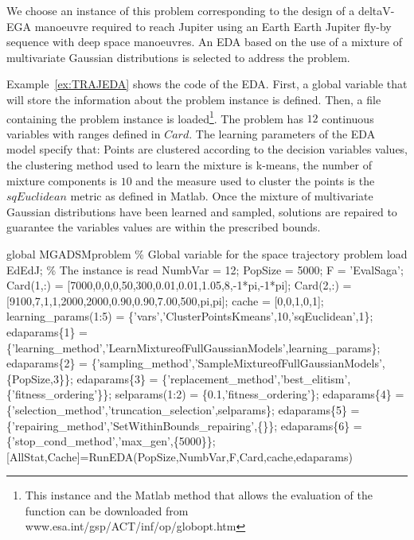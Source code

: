 \documentclass[a4paper]{article}
\begin{document}
We choose an instance of this problem corresponding to the design of a deltaV-EGA manoeuvre
required to reach Jupiter using an Earth Earth Jupiter fly-by sequence with deep space
manoeuvres. An EDA based on the use of a mixture of multivariate Gaussian distributions is selected
to address the problem.

Example~\ref{ex:TRAJEDA} shows the code of the EDA. First, a global variable that will store
the information about the problem instance is defined. Then, a file containing the problem
 instance is loaded\footnote{This instance and the  Matlab method that
 allows the evaluation of the function can be downloaded from
 www.esa.int/gsp/ACT/inf/op/globopt.htm}. The problem has $12$ continuous variables
 with ranges defined in $Card$. The learning parameters of the EDA model specify that:
 Points are clustered according to the decision variables values,
 the clustering method used to learn the mixture is
 k-means,  the number of mixture components is $10$ and the measure used to cluster the points
 is the $sqEuclidean$ metric as defined in Matlab.
 Once the mixture of multivariate Gaussian distributions have been learned and sampled, solutions
 are repaired to guarantee the variables values are within the prescribed bounds.



\begin{example}
\begin{programf}
 global MGADSMproblem \% Global variable for the space trajectory problem
 load EdEdJ;    \% The instance is read
 NumbVar = 12;
 PopSize = 5000;
 F = 'EvalSaga';
 Card(1,:) = [7000,0,0,0,50,300,0.01,0.01,1.05,8,-1*pi,-1*pi];
 Card(2,:) = [9100,7,1,1,2000,2000,0.90,0.90,7.00,500,pi,pi];
 cache  = [0,0,1,0,1];
 learning\_params(1:5) = \{'vars','ClusterPointsKmeans',10,'sqEuclidean',1\};
 edaparams\{1\} = \{'learning\_method','LearnMixtureofFullGaussianModels',learning\_params\};
 edaparams\{2\} = \{'sampling\_method','SampleMixtureofFullGaussianModels',\{PopSize,3\}\};
 edaparams\{3\} = \{'replacement\_method','best\_elitism',\{'fitness\_ordering'\}\};
 selparams(1:2) = \{0.1,'fitness\_ordering'\};
 edaparams\{4\} = \{'selection\_method','truncation\_selection',selparams\};
 edaparams\{5\} = \{'repairing\_method','SetWithinBounds\_repairing',\{\}\};
 edaparams\{6\} = \{'stop\_cond\_method','max\_gen',\{5000\}\};
 [AllStat,Cache]=RunEDA(PopSize,NumbVar,F,Card,cache,edaparams)
\end{programf}
 \label{ex:TRAJEDA} \end{example}
\end{document}
